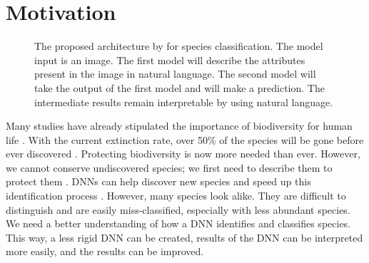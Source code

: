 \documentclass[a4paper, 12pt, oneside]{book} %
\begin{document}
\section{Motivation}

\begin{figure} [t]
    \centering
    \vspace{0cm}
    \caption{The proposed architecture by \textcite{ishikawa_contextual_2021} for species classification. The model input is an image. The first model will describe the attributes present in the image in natural language. The second model will take the output of the first model and will make a prediction. The intermediate results remain interpretable by using natural language.}
    \label{fig:intro}
\end{figure}

Many studies have already stipulated the importance of biodiversity for human life \autocite{pimentel_economic_1997, gowdy_value_1997, raffaelli_links_2010, joppa_biodiversity_2011, pimm_how_2018}.
With the current extinction rate, over 50\% of the species will be gone before ever discovered \autocite{lees_species_2015}.
Protecting biodiversity is now more needed than ever.
However, we cannot conserve undiscovered species; we first need to describe them to protect them \autocite{joppa_biodiversity_2011}.
DNNs can help discover new species and speed up this identification process \autocite{van_horn_inaturalist_2018}.
However, many species look alike.
They are difficult to distinguish and are easily miss-classified, especially with less abundant species.
We need a better understanding of how a DNN identifies and classifies species. 
This way, a less rigid DNN can be created, results of the DNN can be interpreted more easily, and the results can be improved.
\end{document}
